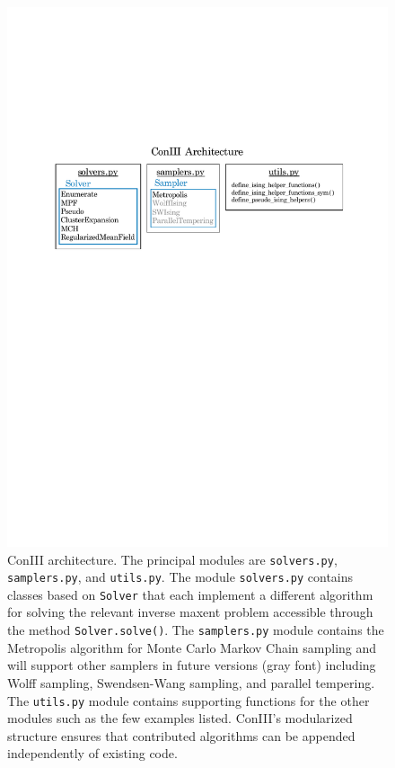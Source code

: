 \documentclass{jors}
\begin{document}
\begin{figure}[tb]
	\includegraphics[width=\linewidth,clip=True,trim=70 450 60 0]{architecture}
	\caption{ConIII architecture. The principal modules are {\tt solvers.py}, {\tt samplers.py}, and {\tt utils.py}. The module {\tt solvers.py} contains classes based on {\tt Solver} that each implement a different algorithm for solving the relevant inverse maxent problem accessible through the method {\tt Solver.solve()}. The {\tt samplers.py} module contains the Metropolis algorithm for Monte Carlo Markov Chain sampling and will support other samplers in future versions (gray font) including Wolff sampling, Swendsen-Wang sampling, and parallel tempering. The {\tt utils.py} module contains supporting functions for the other modules such as the few examples listed. ConIII's modularized structure ensures that contributed algorithms can be appended independently of existing code.}
	\label{gr:architecture}
\end{figure}
\end{document}
